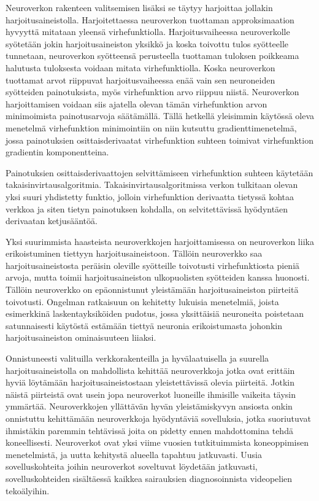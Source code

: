 \documentclass[finnish]{tktltiki2}
\begin{document}
  Neuroverkon rakenteen valitsemisen lisäksi se täytyy harjoittaa jollakin harjoitusaineistolla. Harjoitettaessa neuroverkon tuottaman approksimaation hyvyyttä mitataan yleensä virhefunktiolla. Harjoitusvaiheessa neuroverkolle syötetään jokin harjoitusaineiston yksikkö ja koska toivottu tulos syötteelle tunnetaan, neuroverkon syötteensä perusteella tuottaman tuloksen poikkeama halutusta tuloksesta voidaan mitata virhefunktiolla. Koska neuroverkon tuottamat arvot riippuvat harjoitusvaiheessa enää vain sen neuroneiden syötteiden painotuksista, myös virhefunktion arvo riippuu niistä. Neuroverkon harjoittamisen voidaan siis ajatella olevan tämän virhefunktion arvon minimoimista painotusarvoja säätämällä. Tällä hetkellä yleisimmin käytössä oleva menetelmä virhefunktion minimointiin on niin kutsuttu gradienttimenetelmä, jossa painotuksien osittaisderivaatat virhefunktion suhteen toimivat virhefunktion gradientin komponentteina.

  Painotuksien osittaisderivaattojen selvittämiseen virhefunktion suhteen käytetään takaisinvirtausalgoritmia. Takaisinvirtausalgoritmissa verkon tulkitaan olevan yksi suuri yhdistetty funktio, jolloin virhefunktion derivaatta tietyssä kohtaa verkkoa ja siten tietyn painotuksen kohdalla, on selvitettävissä hyödyntäen derivaatan ketjusääntöä.


  Yksi suurimmista haasteista neuroverkkojen harjoittamisessa on neuroverkon liika erikoistuminen tiettyyn harjoitusaineistoon. Tällöin neuroverkko saa harjoitusaineistosta peräisin oleville syötteille toivotusti virhefunktiosta pieniä arvoja, mutta toimii harjoitusaineiston ulkopuolisten syötteiden kanssa huonosti. Tällöin neuroverkko on epäonnistunut yleistämään harjoitusaineiston piirteitä toivotusti. Ongelman ratkaisuun on kehitetty lukuisia menetelmiä, joista esimerkkinä laskentayksiköiden pudotus, jossa yksittäisiä neuroneita poistetaan satunnaisesti käytöstä estämään tiettyä neuronia erikoistumasta johonkin harjoitusaineiston ominaisuuteen liiaksi.

  Onnistuneesti valituilla verkkorakenteilla ja hyvälaatuisella ja suurella harjoitusaineistolla on mahdollista kehittää neuroverkkoja jotka ovat erittäin hyviä löytämään harjoitusaineistostaan yleistettävissä olevia piirteitä. Jotkin näistä piirteistä ovat usein jopa neuroverkot luoneille ihmisille vaikeita täysin ymmärtää. Neuroverkkojen yllättävän hyvän yleistämiskyvyn ansiosta onkin onnistuttu kehittämään neuroverkkoja hyödyntäviä sovelluksia, jotka suoriutuvat ihmistäkin paremmin tehtävissä joita on pidetty ennen mahdottomina tehdä koneellisesti. Neuroverkot ovat yksi viime vuosien tutkituimmista koneoppimisen menetelmistä, ja uutta kehitystä alueella tapahtuu jatkuvasti. Uusia sovelluskohteita joihin neuroverkot soveltuvat löydetään jatkuvasti, sovelluskohteiden sisältäessä kaikkea sairauksien diagnosoinnista videopelien tekoälyihin.

  
\end{document}
